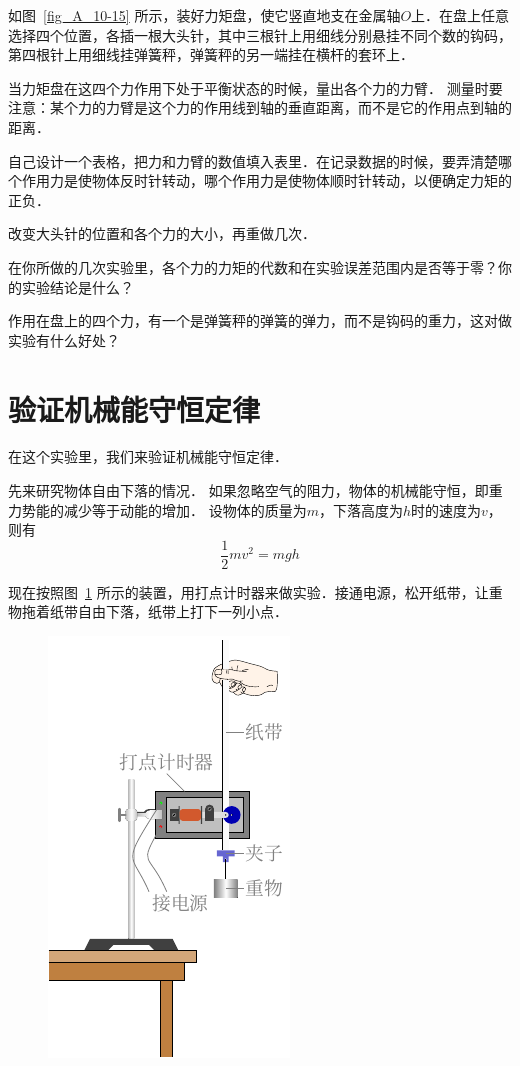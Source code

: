 如图~\ref{fig_A_10-15} 所示，装好力矩盘，使它竖直地支在金属轴$O$上．在盘上任意选择四个位置，各插一根大头针，其中三根针上用细线分别悬挂不同个数的钩码，第四根针上用细线挂弹簧秤，弹簧秤的另一端挂在横杆的套环上．

当力矩盘在这四个力作用下处于平衡状态的时候，量出各个力的力臂．
测量时要注意：某个力的力臂是这个力的作用线到轴的垂直距离，而不是它的作用点到轴的距离．

自己设计一个表格，把力和力臂的数值填入表里．在记录数据的时候，要弄清楚哪个作用力是使物体反时针转动，哪个作用力是使物体顺时针转动，以便确定力矩的正负．

改变大头针的位置和各个力的大小，再重做几次．

在你所做的几次实验里，各个力的力矩的代数和在实验误差范围内是否等于零？你的实验结论是什么？

作用在盘上的四个力，有一个是弹簧秤的弹簧的弹力，而不是钩码的重力，这对做实验有什么好处？

\section{验证机械能守恒定律}
在这个实验里，我们来验证机械能守恒定律．

先来研究物体自由下落的情况．
如果忽略空气的阻力，物体的机械能守恒，即重力势能的减少等于动能的增加．
设物体的质量为$m$，下落高度为$h$时的速度为$v$，则有
\[\frac{1}{2}mv^2=mgh\]

现在按照图~\ref{fig_A_10-16} 所示的装置，用打点计时器来做实验．接通电源，松开纸带，让重物拖着纸带自由下落，纸带上打下一列小点．
\begin{figure}[htbp]
    \centering
    \includegraphics{fig/A/10-16.pdf}
    \caption{}\label{fig_A_10-16}
\end{figure}

